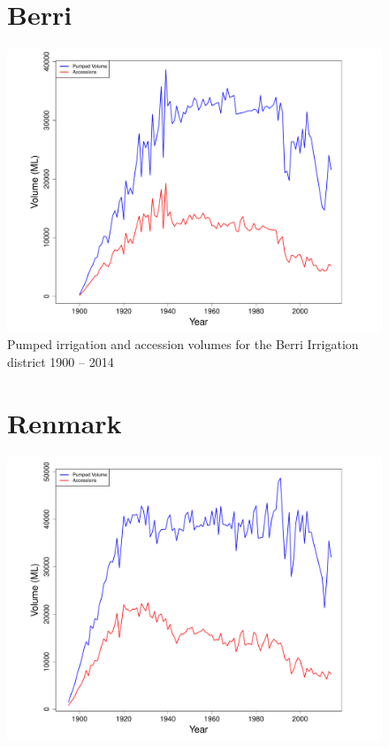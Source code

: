 \documentclass[a4paper, titlepage, 12pt]{article}\usepackage[]{graphicx}\usepackage[]{color}
\makeatletter
\def\maxwidth{ %
  \ifdim\Gin@nat@width>\linewidth
    \linewidth
  \else
    \Gin@nat@width
  \fi
}
\newenvironment{knitrout}{}{} %
\makeatother
\begin{document}
\begin{sffamily}
\begin{appendices}
\begin{figure}
\section{Berri}
\begin{knitrout}
\color{fgcolor}
\includegraphics[width=\maxwidth]{../figures/Berri-1} 

\end{knitrout}
\caption{Pumped irrigation and accession volumes for the Berri Irrigation district 1900 -- 2014}
\label{fig05}
\end{figure}

\begin{figure}
\section{Renmark}
\begin{knitrout}
\color{fgcolor}
\includegraphics[width=\maxwidth]{../figures/Renmark-1} 


\end{knitrout}
\end{figure}
\end{appendices}
\end{sffamily}
\end{document}
